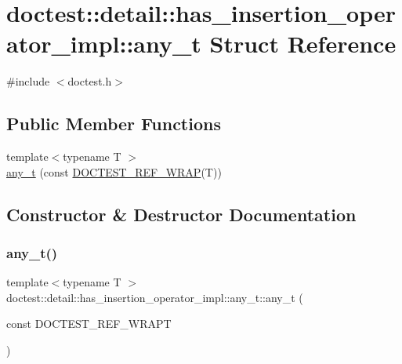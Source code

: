 \hypertarget{structdoctest_1_1detail_1_1has__insertion__operator__impl_1_1any__t}{}\section{doctest\+:\+:detail\+:\+:has\+\_\+insertion\+\_\+operator\+\_\+impl\+:\+:any\+\_\+t Struct Reference}
\label{structdoctest_1_1detail_1_1has__insertion__operator__impl_1_1any__t}


{\ttfamily \#include $<$doctest.\+h$>$}

\subsection*{Public Member Functions}
\begin{DoxyCompactItemize}
\item 
{\footnotesize template$<$typename T $>$ }\\\hyperlink{structdoctest_1_1detail_1_1has__insertion__operator__impl_1_1any__t_a253f4ce5a749ffd79ae9b1c68914e69b}{any\+\_\+t} (const \hyperlink{doctest_8h_af2901cafb023c57fb672ccb1bf14f2eb}{D\+O\+C\+T\+E\+S\+T\+\_\+\+R\+E\+F\+\_\+\+W\+R\+AP}(T))
\end{DoxyCompactItemize}


\subsection{Constructor \& Destructor Documentation}
\mbox{\label{structdoctest_1_1detail_1_1has__insertion__operator__impl_1_1any__t_a253f4ce5a749ffd79ae9b1c68914e69b}} 
\subsubsection{\texorpdfstring{any\+\_\+t()}{any\_t()}}
{\footnotesize\ttfamily template$<$typename T $>$ \\
doctest\+::detail\+::has\+\_\+insertion\+\_\+operator\+\_\+impl\+::any\+\_\+t\+::any\+\_\+t (\begin{DoxyParamCaption}\item[{const }]{D\+O\+C\+T\+E\+S\+T\+\_\+\+R\+E\+F\+\_\+\+W\+R\+APT }\end{DoxyParamCaption})}

